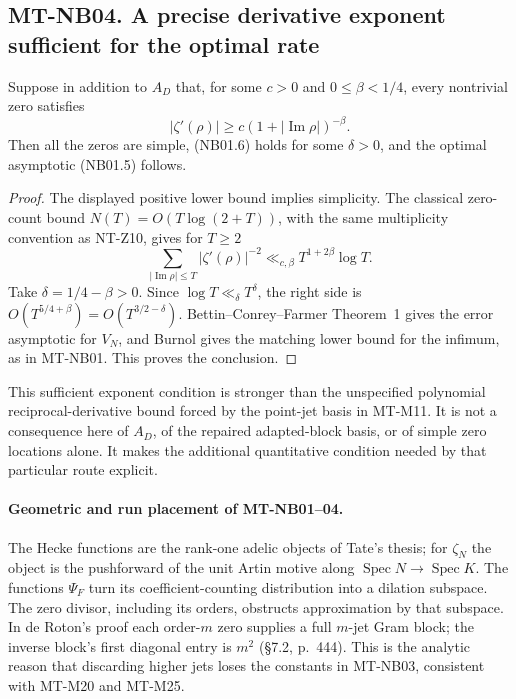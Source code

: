 \subsection*{MT-NB04. A precise derivative exponent sufficient for the optimal rate}

Suppose in addition to $A_D$ that, for some $c>0$ and
$0\le\beta<1/4$, every nontrivial zero satisfies
\[
             |\zeta'(\rho)|\ge c(1+|\operatorname{Im}\rho|)^{-\beta}.
 \tag{NB04.1}
\]
Then all the zeros are simple, (NB01.6) holds for some
$\delta>0$, and the optimal asymptotic (NB01.5) follows.

\begin{proof}
The displayed positive lower bound implies simplicity. The
classical zero-count bound $N(T)=O(T\log(2+T))$, with the
same multiplicity convention as NT-Z10, gives for $T\ge2$
\[
 \sum_{|\operatorname{Im}\rho|\le T}|\zeta'(\rho)|^{-2}
                 \ll_{c,\beta}T^{1+2\beta}\log T.
\]
Take $\delta=1/4-\beta>0$. Since $\log T\ll_\delta T^\delta$,
the right side is $O(T^{5/4+\beta})=O(T^{3/2-\delta})$.
Bettin--Conrey--Farmer Theorem~1 gives the error asymptotic
for $V_N$, and Burnol gives the matching lower bound for
the infimum, as in MT-NB01. This proves the conclusion.
\end{proof}

This sufficient exponent condition is stronger than the
unspecified polynomial reciprocal-derivative bound forced by
the point-jet basis in MT-M11. It is not a consequence here
of $A_D$, of the repaired adapted-block basis, or of simple
zero locations alone. It makes the additional quantitative
condition needed by that particular route explicit.

\paragraph{Geometric and run placement of MT-NB01--04.}
The Hecke functions are the rank-one adelic objects of Tate's
thesis; for $\zeta_N$ the object is the pushforward of the unit
Artin motive along $\operatorname{Spec}N\to\operatorname{Spec}K$.
The functions $\Psi_F$ turn its coefficient-counting distribution
into a dilation subspace. The zero divisor, including its
orders, obstructs approximation by that subspace. In de Roton's
proof each order-$m$ zero supplies a full $m$-jet Gram block;
the inverse block's first diagonal entry is $m^2$ (\S7.2,
p.~444). This is the analytic reason that discarding higher
jets loses the constants in MT-NB03, consistent with MT-M20
and MT-M25.

